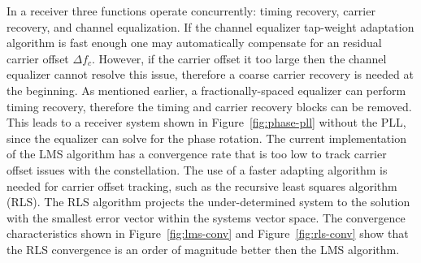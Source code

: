 In a receiver three functions operate concurrently: timing recovery, carrier recovery, and channel equalization. If the channel equalizer tap-weight adaptation algorithm is fast enough one may automatically compensate for an residual carrier offset $\Delta f_c$. However, if the carrier offset it too large then the channel equalizer cannot resolve this issue, therefore a coarse carrier recovery is needed at the beginning. As mentioned earlier, a fractionally-spaced equalizer can perform timing recovery, therefore the timing and carrier recovery blocks can be removed. This leads to a receiver system shown in Figure~\ref{fig:phase-pll} without the PLL, since the equalizer can solve for the phase rotation. The current implementation of the LMS algorithm has a convergence rate that is too low to track carrier offset issues with the constellation. The use of a faster adapting algorithm is needed for carrier offset tracking, such as the recursive least squares algorithm (RLS). The RLS algorithm projects the under-determined system to the solution with the smallest error vector within the systems vector space. The convergence characteristics shown in Figure~\ref{fig:lms-conv} and Figure~\ref{fig:rls-conv} show that the RLS convergence is an order of magnitude better then the LMS algorithm.